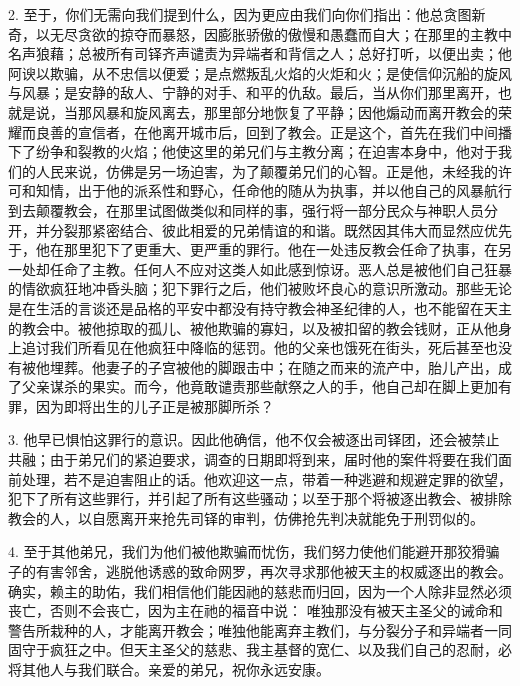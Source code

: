 2. 至于，你们无需向我们提到什么，因为更应由我们向你们指出：他总贪图新奇，以无尽贪欲的掠夺而暴怒，因膨胀骄傲的傲慢和愚蠢而自大；在那里的主教中名声狼藉；总被所有司铎齐声谴责为异端者和背信之人；总好打听，以便出卖；他阿谀以欺骗，从不忠信以便爱；是点燃叛乱火焰的火炬和火；是使信仰沉船的旋风与风暴；是安静的敌人、宁静的对手、和平的仇敌。最后，当从你们那里离开，也就是说，当那风暴和旋风离去，那里部分地恢复了平静；因他煽动而离开教会的荣耀而良善的宣信者，在他离开城市后，回到了教会。正是这个，首先在我们中间播下了纷争和裂教的火焰；他使这里的弟兄们与主教分离；在迫害本身中，他对于我们的人民来说，仿佛是另一场迫害，为了颠覆弟兄们的心智。正是他，未经我的许可和知情，出于他的派系性和野心，任命他的随从为执事，并以他自己的风暴航行到去颠覆教会，在那里试图做类似和同样的事，强行将一部分民众与神职人员分开，并分裂那紧密结合、彼此相爱的兄弟情谊的和谐。既然因其伟大而显然应优先于，他在那里犯下了更重大、更严重的罪行。他在一处违反教会任命了执事，在另一处却任命了主教。任何人不应对这类人如此感到惊讶。恶人总是被他们自己狂暴的情欲疯狂地冲昏头脑；犯下罪行之后，他们被败坏良心的意识所激动。那些无论是在生活的言谈还是品格的平安中都没有持守教会神圣纪律的人，也不能留在天主的教会中。被他掠取的孤儿、被他欺骗的寡妇，以及被扣留的教会钱财，正从他身上追讨我们所看见在他疯狂中降临的惩罚。他的父亲也饿死在街头，死后甚至也没有被他埋葬。他妻子的子宫被他的脚跟击中；在随之而来的流产中，胎儿产出，成了父亲谋杀的果实。而今，他竟敢谴责那些献祭之人的手，他自己却在脚上更加有罪，因为即将出生的儿子正是被那脚所杀？\par

3. 他早已惧怕这罪行的意识。因此他确信，他不仅会被逐出司铎团，还会被禁止共融；由于弟兄们的紧迫要求，调查的日期即将到来，届时他的案件将要在我们面前处理，若不是迫害阻止的话。他欢迎这一点，带着一种逃避和规避定罪的欲望，犯下了所有这些罪行，并引起了所有这些骚动；以至于那个将被逐出教会、被排除教会的人，以自愿离开来抢先司铎的审判，仿佛抢先判决就能免于刑罚似的。\par

4. 至于其他弟兄，我们为他们被他欺骗而忧伤，我们努力使他们能避开那狡猾骗子的有害邻舍，逃脱他诱惑的致命网罗，再次寻求那他被天主的权威逐出的教会。确实，赖主的助佑，我们相信他们能因祂的慈悲而归回，因为一个人除非显然必须丧亡，否则不会丧亡，因为主在祂的福音中说： 唯独那没有被天主圣父的诫命和警告所栽种的人，才能离开教会；唯独他能离弃主教们，与分裂分子和异端者一同固守于疯狂之中。但天主圣父的慈悲、我主基督的宽仁、以及我们自己的忍耐，必将其他人与我们联合。亲爱的弟兄，祝你永远安康。\par

